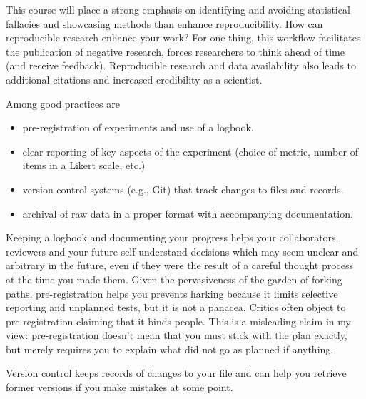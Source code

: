 \documentclass[
  11pt,
  letterpaper,
]{scrbook}
\providecommand{\tightlist}{%
  \setlength{\itemsep}{0pt}\setlength{\parskip}{0pt}}\usepackage{longtable,booktabs,array}
\theoremstyle{definition}
\theoremstyle{remark}
\begin{document}
This course will place a strong emphasis on identifying and avoiding
statistical fallacies and showcasing methods than enhance
reproducibility. How can reproducible research enhance your work? For
one thing, this workflow facilitates the publication of negative
research, forces researchers to think ahead of time (and receive
feedback). Reproducible research and data availability also leads to
additional citations and increased credibility as a scientist.

Among good practices are

\begin{itemize}
\tightlist
\item
  pre-registration of experiments and use of a logbook.
\item
  clear reporting of key aspects of the experiment (choice of metric,
  number of items in a Likert scale, etc.)
\item
  version control systems (e.g., Git) that track changes to files and
  records.
\item
  archival of raw data in a proper format with accompanying
  documentation.
\end{itemize}

Keeping a logbook and documenting your progress helps your
collaborators, reviewers and your future-self understand decisions which
may seem unclear and arbitrary in the future, even if they were the
result of a careful thought process at the time you made them. Given the
pervasiveness of the garden of forking paths, pre-registration helps you
prevents harking because it limits selective reporting and unplanned
tests, but it is not a panacea. Critics often object to pre-registration
claiming that it binds people. This is a misleading claim in my view:
pre-registration doesn't mean that you must stick with the plan exactly,
but merely requires you to explain what did not go as planned if
anything.

Version control keeps records of changes to your file and can help you
retrieve former versions if you make mistakes at some point.
\end{document}
